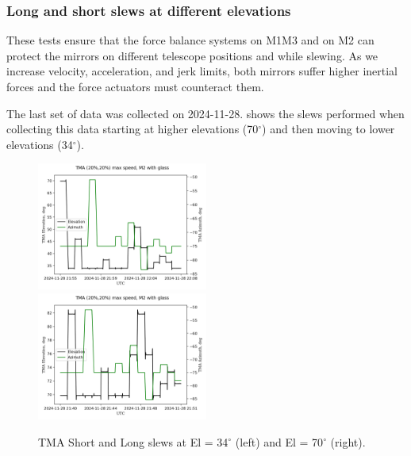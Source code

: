 \subsubsection{Long and short slews at different elevations}
\label{subsubsec:long_and_short_slews}

These tests ensure that the force balance systems on M1M3 and on M2 can protect
the mirrors on different telescope positions and while slewing. As we increase
velocity, acceleration, and jerk limits, both mirrors suffer higher inertial
forces and the force actuators must counteract them.


The last set of data was collected on 2024-11-28. 
shows the
slews performed when collecting this data starting at higher elevations (70$^\circ$)
and then moving to lower elevations (34$^\circ$).

\begin{center}
  \begin{figure}
    \includegraphics[width=0.5\textwidth]{spa/20_vel_acc_jerk/BLOCK-T227_azel_slews.png}
    \includegraphics[width=0.5\textwidth]{spa/20_vel_acc_jerk/BLOCK-T293_azel_slews.png}
    \caption{TMA Short and Long slews at El = 34$^\circ$ (left) and El = 70$^\circ$ (right).}
    \label{fig:block227_293_azel_slews}
  \end{figure}
\end{center}

